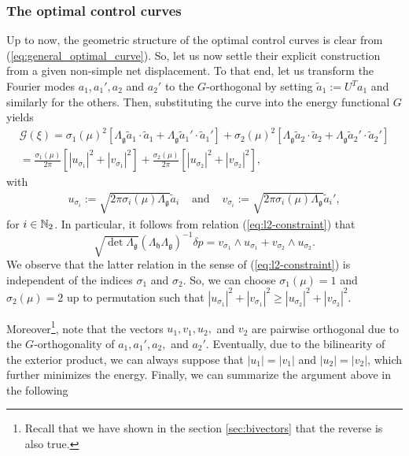 \subsubsection{The optimal control curves}
Up to now, the geometric structure of the optimal control curves is clear from (\ref{eq:general_optimal_curve}). So, let us now settle their explicit construction from a given non-simple net displacement. To that end, let us transform the Fourier modes $a_1, a_1', a_2$ and $a_2'$ to the $G$-orthogonal by setting $\tilde{a}_1 := U^Ta_1$ and similarly for the others. Then, substituting the curve into the energy functional $G$ yields
\begin{align}
\label{eq:optimal_energy}
	\mathcal{G}(\xi) = \sigma_1(\mu)^2[\Lambda_{\mathfrak{g}}\tilde{a}_1 \cdot \tilde{a}_1 + \Lambda_\mathfrak{g} \tilde{a}_1' \cdot \tilde{a}_1'] + \sigma_2(\mu)^2[\Lambda_{\mathfrak{g}} \tilde{a}_2 \cdot \tilde{a}_2 + \Lambda_{\mathfrak{g}}\tilde{a}_2' \cdot \tilde{a}_2']\\
	=\frac{\sigma_1(\mu)}{2 \pi} [|u_{\sigma_1}|^2 + |v_{\sigma_1}|^2] + \frac{\sigma_2(\mu)}{2 \pi}[|u_{\sigma_2}|^2 + |v_{\sigma_2}|^2],
\end{align}
with 
\begin{align}
	u_{\sigma_i} := \sqrt{2 \pi \sigma_i(\mu) \Lambda_\mathfrak{g}}\tilde{a}_i &\text{ and }& v_{\sigma_i} := \sqrt{2 \pi \sigma_i(\mu) \Lambda_{\mathfrak{g}}} \tilde{a}_i',
\end{align}
for $i \in \mathbb{N}_2$. In particular, it follows from relation (\ref{eq:l2-constraint}) that
\begin{equation}
	\sqrt{\det \Lambda_{\mathfrak{g}}}(\Lambda_{\mathfrak{h}} \Lambda_{\mathfrak{g}})^{-1} \delta p = v_{\sigma_1} \wedge u_{\sigma_1} + v_{\sigma_2} \wedge u_{\sigma_2}.
\end{equation}
We observe that the latter relation in the sense of (\ref{eq:l2-constraint}) is independent of the indices $\sigma_1$ and $\sigma_2$.  So, we can choose $\sigma_1(\mu) = 1$ and $ \sigma_2(\mu) = 2$ up to permutation such that $|u_{\sigma_1}|^2 + |v_{\sigma_1}|^2 \geq |u_{\sigma_2}|^2 + |v_{\sigma_2}|^2$.

Moreover\footnote{Recall that we have shown in the section \ref{sec:bivectors} that the reverse is also true.}, note that the vectors $u_1, v_1, u_2,$ and $v_2$ are pairwise orthogonal due to the $G$-orthogonality of $a_1, a_1', a_2,$ and $a_2'$. Eventually, due to the bilinearity of the exterior product, we can always suppose that $|u_1| = |v_1|$ and $|u_2| = |v_2|$, which further minimizes the energy. Finally, we can summarize the argument above in the following

